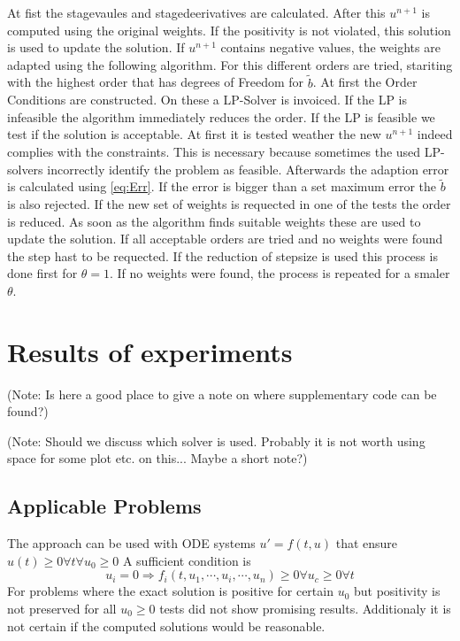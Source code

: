 \documentclass[a4paper]{scrartcl}
\numberwithin{equation}{section}
\theoremstyle{plain}
\theoremstyle{definition}
\numberwithin{theorem}{section}
\newcommand{\1}{\mathbbm{1}}
\begin{document}
At fist the stagevaules and stagedeerivatives are calculated.
After this $u^{n+1}$ is computed using the original weights. If the positivity is not violated, this solution is used to update the solution. 
If $u^{n+1}$ contains negative values, the weights are adapted using the following algorithm.
For this different orders are tried, stariting with the highest order that has degrees of Freedom for $\tilde{b}$. 
At first the Order Conditions are constructed. On these a LP-Solver is invoiced. If the LP is infeasible the algorithm immediately reduces the order. If the LP is feasible we test if the solution is acceptable. At first it is tested weather the new $u^{n+1}$ indeed complies with the constraints. This is necessary because sometimes the used LP-solvers incorrectly identify the problem as feasible. %
Afterwards the adaption error is calculated using \eqref{eq:Err}. If the error is bigger than a set maximum error the $\tilde{b}$ is also rejected.
If the new set of weights is requected in one of the tests the order is reduced.
As soon as the algorithm finds suitable weights these are used to update the solution.
If all acceptable orders are tried and no weights were found the step hast to be requected.
If the reduction of stepsize is used this process is done first for $\theta = 1$. If no weights were found, the process is repeated for a smaler $\theta$. 



\section{Results of experiments}\label{sec:Numeric_Results}

(Note: Is here a good place to give a note on where supplementary code can be found?)

(Note: Should we discuss which solver is used. Probably it is not worth using space for some plot etc. on this... Maybe a short note?)

\subsection{Applicable Problems}\label{sec:app_problem}
The approach can be used with ODE systems $u' = f(t,u)$ that ensure  $u(t) \geq 0 \forall t \forall {  u_0 \geq 0}$ 
A sufficient condition is  
\begin{equation}
u_i=0 \Rightarrow f_i(t,u_1,\cdots,u_i,\cdots,u_n) \geq 0  \forall {u_c \geq 0} \forall {t}
\end{equation}
For problems where the exact solution is positive for certain $u_0$ but positivity is not preserved for all $u_0 \geq 0$ tests did not show promising results. Additionaly it is not certain if the computed solutions would be reasonable.
\end{document}
